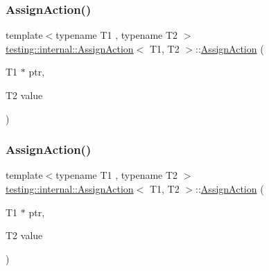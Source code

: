 \subsubsection{\texorpdfstring{AssignAction()}{AssignAction()}\hspace{0.1cm}{\footnotesize\ttfamily [1/3]}}
{\footnotesize\ttfamily template$<$typename T1 , typename T2 $>$ \\
\mbox{\hyperlink{classtesting_1_1internal_1_1_assign_action}{testing\+::internal\+::\+Assign\+Action}}$<$ T1, T2 $>$\+::\mbox{\hyperlink{classtesting_1_1internal_1_1_assign_action}{Assign\+Action}} (\begin{DoxyParamCaption}\item[{T1 $\ast$}]{ptr,  }\item[{T2}]{value }\end{DoxyParamCaption})\hspace{0.3cm}{\ttfamily [inline]}}

\mbox{\label{classtesting_1_1internal_1_1_assign_action_ae5a8fe8954ff3f8b26a08b57c3afdf9a}} 
\subsubsection{\texorpdfstring{AssignAction()}{AssignAction()}\hspace{0.1cm}{\footnotesize\ttfamily [2/3]}}
{\footnotesize\ttfamily template$<$typename T1 , typename T2 $>$ \\
\mbox{\hyperlink{classtesting_1_1internal_1_1_assign_action}{testing\+::internal\+::\+Assign\+Action}}$<$ T1, T2 $>$\+::\mbox{\hyperlink{classtesting_1_1internal_1_1_assign_action}{Assign\+Action}} (\begin{DoxyParamCaption}\item[{T1 $\ast$}]{ptr,  }\item[{T2}]{value }\end{DoxyParamCaption})\hspace{0.3cm}{\ttfamily [inline]}}

\mbox{\label{classtesting_1_1internal_1_1_assign_action_ae5a8fe8954ff3f8b26a08b57c3afdf9a}} 
